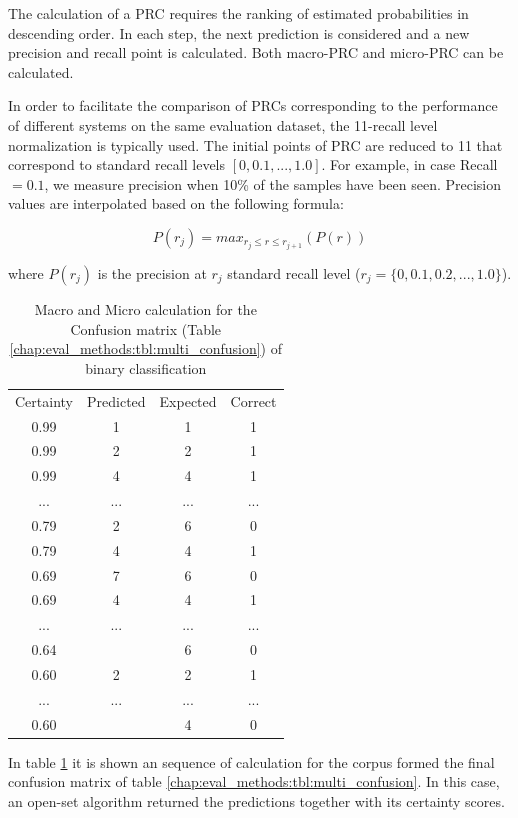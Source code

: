 The calculation of a PRC requires the ranking of estimated probabilities in descending order. In each step, the next prediction is considered and a new precision and recall point is calculated. Both macro-PRC and micro-PRC can be calculated.

In order to facilitate the comparison of PRCs corresponding to the performance of different systems on the same evaluation dataset, the 11-recall level normalization is typically used. The initial points of PRC are reduced to 11 that correspond to standard recall levels $[0,0.1,...,1.0]$. For example, in case Recall$=0.1$, we measure precision when 10\% of the samples have been seen. Precision values are interpolated based on the following formula:

\begin{equation}\label{chap:eval_methods:eq:11recall_level}
	P(r_j)=max_{r_j \leqslant r \leqslant r_{j+1}}(P(r))
\end{equation}

\noindent
where $P(r_j)$ is the precision at $r_j$ standard recall level ($r_j=\{0,0.1,0.2,...,1.0\}$).

\begin{table}[t]
	\center
	\caption{Macro and Micro calculation for the Confusion matrix (Table \ref{chap:eval_methods:tbl:multi_confusion}) of binary classification}\label{chap:eval_methods:tbl:prc}
	\begin{tabular}{|c|c|c|c|}
		\cline{1-4}
		Certainty & Predicted & Expected & Correct\\
		\cline{1-4}
		0.99 & 1 & 1 & 1 \\
		0.99 & 2 & 2 & 1 \\
		0.99 & 4 & 4 & 1 \\
		... & ... & ... & ... \\
		0.79 & 2 & 6 & 0 \\
		0.79 & 4 & 4 & 1 \\
		0.69 & 7 & 6 & 0 \\
		0.69 & 4 & 4 & 1 \\
		... & ... & ... & ... \\
		0.64 & \emptyset & 6 & 0 \\
		0.60 & 2 & 2 & 1 \\
		... & ... & ... & ... \\
		0.60 & \emptyset & 4 & 0 \\
		\cline{1-4}
	\end{tabular}
\end{table}

In table \ref{chap:eval_methods:tbl:prc} it is shown an sequence of calculation for the corpus formed the final confusion matrix of table \ref{chap:eval_methods:tbl:multi_confusion}. In this case, an open-set algorithm returned the predictions together with its certainty scores. 

